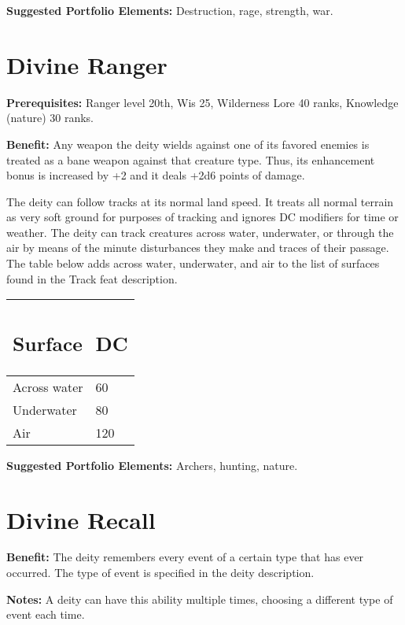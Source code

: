 \documentclass{article}
\begin{document}
\textbf{Suggested Portfolio Elements:} Destruction, rage, strength, war.

\vspace{12pt}
\section*{Divine Ranger}

\textbf{Prerequisites:} Ranger level 20th, Wis 25, Wilderness Lore 40 ranks, Knowledge 
(nature) 30 ranks.

\textbf{Benefit:} Any weapon the deity wields against one of its favored enemies 
is treated as a bane weapon against that creature type. Thus, its enhancement bonus 
is increased by +2 and it deals +2d6 points of damage.

The deity can follow tracks at its normal land speed. It treats all normal terrain 
as very soft ground for purposes of tracking and ignores DC modifiers for time 
or weather. The deity can track creatures across water, underwater, or through 
the air by means of the minute disturbances they make and traces of their passage. 
The table below adds across water, underwater, and air to the list of surfaces 
found in the Track feat description.

\begin{tabular}{|>{\raggedright}p{56pt}|>{\raggedright}p{18pt}|}
\hline
\subsection*{S\textbf{urface}} & \subsection*{D\textbf{C}}\tabularnewline
\hline
Across water & 60\tabularnewline
\hline
Underwater  & 80\tabularnewline
\hline
Air  & 120\tabularnewline
\hline
\end{tabular}

\textbf{Suggested Portfolio Elements:} Archers, hunting, nature.

\vspace{12pt}
\section*{Divine Recall}

\textbf{Benefit:} The deity remembers every event of a certain type that has ever 
occurred. The type of event is specified in the deity description.

\textbf{Notes:} A deity can have this ability multiple times, choosing a different 
type of event each time.
\end{document}
